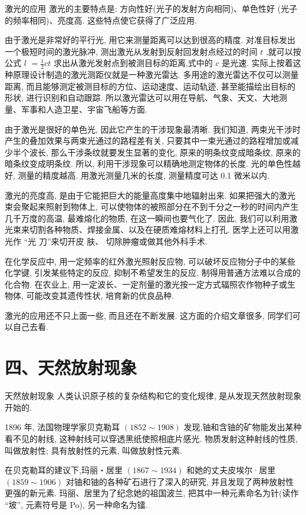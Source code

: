 \documentclass[10pt]{article}
\begin{document}
激光的应用 激光的主要特点是: 方向性好(光子的发射方向相同)、单色性好 (光子的频率相同)、亮度高. 这些特点使它获得了广泛应用.

由于激光是非常好的平行光, 用它来测量距离可以达到很高的精度. 对准目标发出一个极短时间的激光脉冲, 测出激光从发射到反射回发射点经过的时间 \(t\) ,就可以按公式 \(l\) \(= \frac{1}{2}{ct}\) 求出从激光发射点到被测目标的距离,式中的 \(c\) 是光速. 实际上按着这种原理设计制造的激光测距仪就是一种激光雷达. 多用途的激光雷达不仅可以测量距离, 而且能够测定被测目标的方位、运动速度、运动轨迹, 甚至能描绘出目标的形状, 进行识别和自动跟踪. 所以激光雷达可以用在导航、气象、天文、大地测量、军事和人造卫星、宇宙飞船等方面.

由于激光是很好的单色光, 因此它产生的干涉现象最清晰. 我们知道, 两束光干涉时产生的叠加效果与两束光通过的路程差有关, 只要其中一束光通过的路程增加或减少半个波长, 那么干涉条纹就要发生显著的变化, 原来的明条纹变成暗条纹, 原来的暗条纹变成明条纹. 所以, 利用干涉现象可以精确地测定物体的长度. 光的单色性越好, 测量的精度越高. 用激光测量几米的长度, 测量精度可达 0.1 微米以内.

激光的亮度高, 是由于它能把巨大的能量高度集中地辐射出来. 如果把强大的激光束会聚起来照射到物体上, 可以使物体的被照部分在不到千分之一秒的时间内产生几千万度的高温, 最难熔化的物质, 在这一瞬间也要气化了. 因此, 我们可以利用激光束来切割各种物质、焊接金属、以及在硬质难熔材料上打孔. 医学上还可以用激光作 “光 刀”来切开皮 肤、 切除肿瘤或做其他外科手术.

在化学反应中, 用一定频率的红外激光照射反应物, 可以破坏反应物分子中的某些化学键, 引发某些特定的反应, 抑制不希望发生的反应, 制得用普通方法难以合成的化合物. 在农业上, 用一定波长、一定剂量的激光按一定方式辐照农作物种子或生物体, 可能改变其遗传性状, 培育新的优良品种.

激光的应用还不只上面一些, 而且还在不断发展. 这方面的介绍文章很多, 同学们可以自己去看.

\section*{四、天然放射现象}

天然放射现象 人类认识原子核的复杂结构和它的变化规律, 是从发现天然放射现象开始的.

1896 年, 法国物理学家贝克勒耳 \(\left( {{1852} \sim {1908}}\right)\) 发现,铀和含铀的矿物能发出某种看不见的射线, 这种射线可以穿透黑纸使照相底片感光. 物质发射这种射线的性质, 叫做放射性; 具有放射性的元素, 叫做放射性元素.

在贝克勒耳的建议下,玛丽・居里 \(\left( {{1867} \sim {1934}}\right)\) 和她的丈夫皮埃尔·居里 \(\left( {{1859} \sim {1906}}\right)\) 对铀和铀的各种矿石进行了深入的研究, 并且发现了两种放射性更强的新元素. 玛丽、居里为了纪念她的祖国波兰, 把其中一种元素命名为针(读作 “坡”, 元素符号是 Po), 另一种命名为镭.
\end{document}
